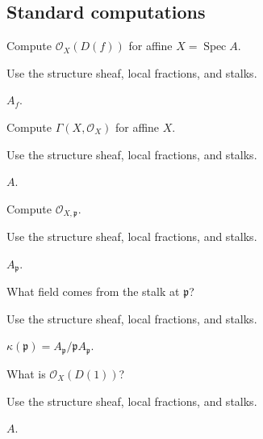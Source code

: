\subsection*{Standard computations}

\begin{exercise}\label{exr:vi17-expand-01}
Compute $\mathcal O_X(D(f))$ for affine $X=\operatorname{Spec}A$.
\end{exercise}
\begin{hint}
Use the structure sheaf, local fractions, and stalks.
\end{hint}
\begin{solution}
$A_f$.
\end{solution}

\begin{exercise}\label{exr:vi17-expand-02}
Compute $\Gamma(X,\mathcal O_X)$ for affine $X$.
\end{exercise}
\begin{hint}
Use the structure sheaf, local fractions, and stalks.
\end{hint}
\begin{solution}
$A$.
\end{solution}

\begin{exercise}[Stalk]\label{exr:vi17-expand-03}
Compute $\mathcal O_{X,\mathfrak p}$.
\end{exercise}
\begin{hint}
Use the structure sheaf, local fractions, and stalks.
\end{hint}
\begin{solution}
$A_{\mathfrak p}$.
\end{solution}

\begin{exercise}[Residue]\label{exr:vi17-expand-04}
What field comes from the stalk at $\mathfrak p$?
\end{exercise}
\begin{hint}
Use the structure sheaf, local fractions, and stalks.
\end{hint}
\begin{solution}
$\kappa(\mathfrak p)=A_{\mathfrak p}/\mathfrak pA_{\mathfrak p}$.
\end{solution}

\begin{exercise}\label{exr:vi17-expand-05}
What is $\mathcal O_X(D(1))$?
\end{exercise}
\begin{hint}
Use the structure sheaf, local fractions, and stalks.
\end{hint}
\begin{solution}
$A$.
\end{solution}

